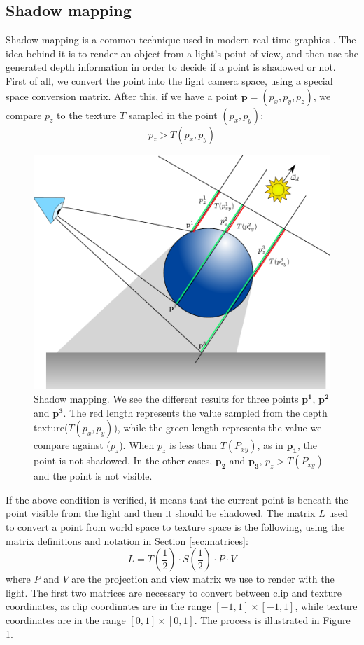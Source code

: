 \subsection{Shadow mapping}
\label{sec:shadow_map}
Shadow mapping is a common technique used in modern real-time graphics \citep{everitt,Segal:1992:FSL:142920.134071,williams1978a}. The idea behind it is to render an object from a light's point of view, and then use the generated depth information in order to decide if a point is shadowed or not. First of all, we convert the point into the light camera space, using a special space conversion matrix. After this, if we have a point $\mathbf{p} = (p_x,p_y,p_z)$, we compare $p_z$ to the texture $T$ sampled in the point $(p_x,p_y)$:
$$
p_z > T(p_x,p_y)
\label{eq:shadowtest}
$$ 
\begin{figure}[!ht]
\centering
\includegraphics[width=\linewidth]{images/method/shadow_map.pdf}
\caption{Shadow mapping. We see the different results for three points $\mathbf{p^1}$, $\mathbf{p^2}$ and $\mathbf{p^3}$. The red length represents the value sampled from the depth texture($T(p_x,p_y)$), while the green length represents the value we compare against ($p_z$). When $p_z$ is less than $T(P_{xy})$, as in $\mathbf{p_1}$, the point is not shadowed. In the other cases, $\mathbf{p_2}$ and $\mathbf{p_3}$, $p_z > T(P_{xy})$and the point is not visible.}
\label{fig:shadow_map}
\end{figure} 

If the above condition is verified, it means that the current point is beneath the point visible from the light and then it should be shadowed. The matrix $L$ used to convert a point from world space to texture space is the following, using the matrix definitions and notation in Section \ref{sec:matrices}:
$$
L = T\left(\frac{1}{2}\right) \cdot S\left(\frac{1}{2}\right) \cdot P \cdot V
$$
where $P$ and $V$ are the projection and view matrix we use to render with the light. The first two matrices are necessary to convert between clip and texture coordinates, as clip coordinates are in the range $[-1,1] \times [-1,1]$, while texture coordinates are in the range $[0,1]\times[0,1]$. The process is illustrated in Figure \ref{fig:shadow_map}.

